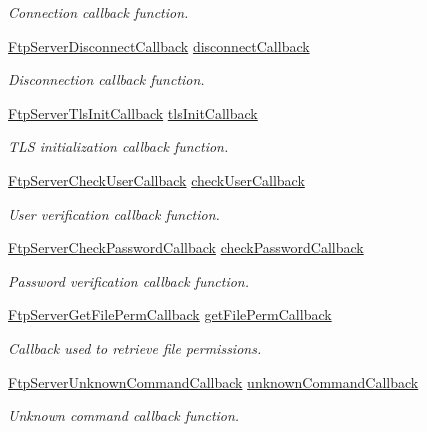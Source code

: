 \begin{DoxyCompactItemize}
\begin{DoxyCompactList}\small\item\em Connection callback function. \end{DoxyCompactList}\item 
\hyperlink{ftp__server_8h_a71c92fb2d972b9f6f519da3cc37ceed6}{Ftp\+Server\+Disconnect\+Callback} \hyperlink{structFtpServerSettings_a4783ee2799969f290291aa5e7891bb8a}{disconnect\+Callback}
\begin{DoxyCompactList}\small\item\em Disconnection callback function. \end{DoxyCompactList}\item 
\hyperlink{ftp__server_8h_a8b7b1540013ad04620b2a5030b23f54f}{Ftp\+Server\+Tls\+Init\+Callback} \hyperlink{structFtpServerSettings_a94ca7c826a4b8531615e59933bdfcc2a}{tls\+Init\+Callback}
\begin{DoxyCompactList}\small\item\em T\+LS initialization callback function. \end{DoxyCompactList}\item 
\hyperlink{ftp__server_8h_adff6dac9b1b8e1a302d97f75d7684791}{Ftp\+Server\+Check\+User\+Callback} \hyperlink{structFtpServerSettings_a9fe22a48651c9d7320341da09aa9c08a}{check\+User\+Callback}
\begin{DoxyCompactList}\small\item\em User verification callback function. \end{DoxyCompactList}\item 
\hyperlink{ftp__server_8h_ac20222f64e4b2b308b2e76ef5d090639}{Ftp\+Server\+Check\+Password\+Callback} \hyperlink{structFtpServerSettings_a4a1c5c51668a5618b57fb94247128e57}{check\+Password\+Callback}
\begin{DoxyCompactList}\small\item\em Password verification callback function. \end{DoxyCompactList}\item 
\hyperlink{ftp__server_8h_a575fa0bf73715de35a6eabd6e6948f27}{Ftp\+Server\+Get\+File\+Perm\+Callback} \hyperlink{structFtpServerSettings_a25ff73d02f8e90eb0536b9560762c3b1}{get\+File\+Perm\+Callback}
\begin{DoxyCompactList}\small\item\em Callback used to retrieve file permissions. \end{DoxyCompactList}\item 
\hyperlink{ftp__server_8h_a2c6f031d62de20ebc8eee7a1647df7a5}{Ftp\+Server\+Unknown\+Command\+Callback} \hyperlink{structFtpServerSettings_a7a0ec4276b7d33f2c9e05432c7fc714b}{unknown\+Command\+Callback}
\begin{DoxyCompactList}\small\item\em Unknown command callback function. \end{DoxyCompactList}\end{DoxyCompactItemize}



